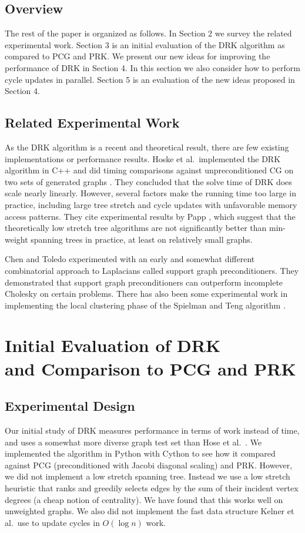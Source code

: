 \documentclass{sig-alternate}
\begin{document}
\subsection{Overview}
The rest of the paper is organized as follows.
In Section 2 we survey  the related experimental work.
Section 3 is an initial evaluation of the DRK algorithm
as compared to PCG and PRK.
We present our new ideas for improving the performance of DRK in Section 4.
In this section we also consider how to perform cycle updates
in parallel.
Section 5 is an evaluation of the new ideas proposed in Section 4.

\subsection{Related Experimental Work}
As the DRK algorithm is a recent and theoretical
result, there are few existing implementations or performance results.
Hoske et al.\ implemented the DRK algorithm in C++ and did timing comparisons
against unpreconditioned CG on two sets of generated graphs \cite{HLMW15}.
They concluded that the solve time of DRK
does scale nearly linearly.
However, several factors make the running time too large in practice,
including large tree stretch and cycle updates
with unfavorable memory access patterns.
They cite
experimental results by Papp \cite{Paap2014}, which
suggest that the theoretically low stretch tree algorithms
are not significantly better than min-weight spanning trees in
practice, at least on relatively small graphs.

Chen and Toledo \cite{ChenToledo2003} experimented with
an early and somewhat different combinatorial approach to Laplacians
called support graph preconditioners. They demonstrated that support graph
preconditioners can outperform incomplete Cholesky on certain problems.
There has also been some experimental work in implementing the local
clustering phase of the Spielman and Teng algorithm \cite{ZLM2013}.

\section[Initial Evaluation of DRK and Comparison to PCG and PRK]
{Initial Evaluation of DRK\\and Comparison to PCG and PRK}

\subsection{Experimental Design}
Our initial study of DRK measures performance in terms of
work instead of time, and uses a somewhat more diverse graph test set
than Hose et al.\ \cite{HLMW15}.
We implemented the algorithm in Python with Cython to see how it compared
against PCG (preconditioned with Jacobi diagonal scaling) and PRK.
However, we did
not implement a low stretch spanning tree.
Instead we use a low stretch heuristic that ranks and greedily
selects edges by the sum
of their incident vertex degrees (a cheap notion of centrality).
We have found that this works well on unweighted graphs.
We also did not implement
the fast data structure Kelner et al.\ use to update cycles in $O(\log{n})$
work.
\end{document}
